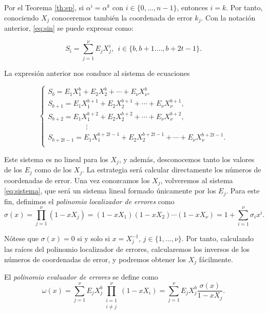 Por el Teorema \ref{th:ep}, si $\alpha^i = \alpha^k$ con $i \in \{0,\dots,n-1\}$, entonces $i = k$. Por tanto, conociendo $X_j$ conoceremos también la coordenada de error $k_j$. Con la notación anterior, \eqref{eq:sin} se puede expresar como:

\begin{equation}\label{eq:sin2}
  S_i = \sum_{j=1}^{\nu}E_jX_j^i, \ \ i \in \{b,b+1.\dots,b + 2t - 1\}.
\end{equation}

La expresión anterior nos conduce al sistema de ecuaciones

\begin{equation}
  \label{eq:sistema}
  \begin{cases}
    S_b = E_1X_1^b + E_2X_2^b + \cdots + E_{\nu}X_{\nu}^b ,\\
    S_{b+1} = E_1X_1^{b+1} + E_2X_2^{b+1} + \cdots + E_{\nu}X_{\nu}^{b+1},\\
    S_{b+2} = E_1X_1^{b+2} + E_2X_2^{b+2} + \cdots + E_{\nu}X_{\nu}^{b+2},\\
    \ \ \ \ \ \  \ \ \  \ \ \  \ \ \  \ \ \  \ \ \  \ \ \ \vdots \\
    S_{b + 2t - 1} = E_1X_1^{b + 2t - 1} + E_2X_2^{b + 2t - 1} + \cdots + E_{\nu}X_{\nu}^{b + 2t - 1}.\\
  \end{cases}
\end{equation}

Este sistema es no lineal para los $X_j$, y además, desconocemos tanto los valores de los $E_j$ como de los $X_j$. La estrategia será calcular directamente los números de coordenadas de error. Una vez conozcamos los $X_j$, volveremos al sistema \eqref{eq:sistema}, que será un sistema lineal formado únicamente por los $E_j$. Para este fin, definimos el \emph{polinomio localizador de errores} como $$\sigma(x) = \prod_{j=1}^{\nu}(1 - xX_j) =  (1- xX_1)(1 - xX_2)\cdots(1- xX_{\nu}) = 1 + \sum_{i=1}^{\nu}\sigma_ix^i.$$

Nótese que $\sigma(x) = 0$ si y solo si $x = X_j^{-1}$, $j \in \{1,\dots,\nu\}$. Por tanto, calculando las raíces del polinomio localizador de errores, calcularemos los inversos de los números de coordenadas de error, y podremos obtener los $X_j$ fácilmente.

\begin{definicion}
El \emph{polinomio evaluador de errores} se define como \begin{equation}\label{eq:sc}\omega(x) = \sum_{j=1}^{\nu}E_jX_j^b\prod_{\substack{i=1 \\ i \neq j}}^{\nu} (1 - x X_i) = \sum_{j=1}^{\nu}E_jX_j^b\frac{\sigma(x)}{1 - xX_j}.
\end{equation}
\end{definicion}

